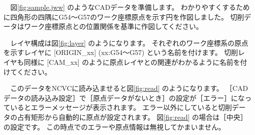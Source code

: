 

\vspace*{1zh}
　図\ref{fig:sample.jww} のようなCADデータを準備します。
わかりやすくするために四角形の四隅にG54～G57のワーク座標原点を示す円を作図しました。
切削データはワーク座標原点との位置関係を基準に作図してください。


　レイヤ構成は図\ref{fig:layer} のようになります。
それぞれのワーク座標系の原点を示すレイヤに [ORIGIN\_xx] (xx:G54～G57) という名前を付けます。
切削レイヤも同様に [CAM\_xx] のように原点レイヤとの関連がわかるように名前を付けてください。


　このデータをNCVCに読み込ませると図\ref{fig:read} のようになります。
［CADデータの読み込み設定］で［原点データがないとき］の設定が［エラー］になっているとエラーメッセージが表示されます。
エラー以外にしていると切削データの占有矩形から自動的に原点が設定されます。
図\ref{fig:read} の場合は［中央］の設定です。
この時点でのエラーや原点情報は無視してかまいません。

